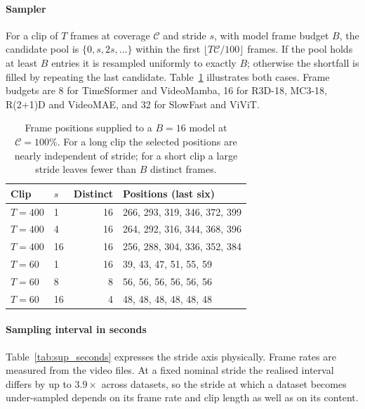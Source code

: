 \documentclass[a4paper, 10pt, conference, onecolumn]{ieeeconf}
\newcommand{\tabtight}{\setlength{\tabcolsep}{3.5pt}\renewcommand{\arraystretch}{1.12}}
\begin{document}
\paragraph{Sampler} For a clip of $T$ frames at coverage $\mathcal{C}$ and
stride $s$, with model frame budget $B$, the candidate pool is
$\{0,s,2s,\dots\}$ within the first $\lfloor T\mathcal{C}/100\rfloor$ frames.
If the pool holds at least $B$ entries it is resampled uniformly to exactly $B$;
otherwise the shortfall is filled by repeating the last candidate.
Table~\ref{tab:sup_indices} illustrates both cases. Frame budgets are 8 for
TimeSformer and VideoMamba, 16 for R3D-18, MC3-18, R(2+1)D and VideoMAE, and 32
for SlowFast and ViViT.

\begin{table}[!htbp]
\centering
\caption{Frame positions supplied to a $B{=}16$ model at $\mathcal{C}{=}100\%$.
For a long clip the selected positions are nearly independent of stride; for a
short clip a large stride leaves fewer than $B$ distinct frames.}
\label{tab:sup_indices}
\scriptsize\tabtight
\begin{tabular}{l l r l}
\toprule
Clip & $s$ & Distinct & Positions (last six) \\
\midrule
$T{=}400$ & 1  & 16 & 266, 293, 319, 346, 372, 399 \\
$T{=}400$ & 4  & 16 & 264, 292, 316, 344, 368, 396 \\
$T{=}400$ & 16 & 16 & 256, 288, 304, 336, 352, 384 \\
\midrule
$T{=}60$  & 1  & 16 & 39, 43, 47, 51, 55, 59 \\
$T{=}60$  & 8  &  8 & 56, 56, 56, 56, 56, 56 \\
$T{=}60$  & 16 &  4 & 48, 48, 48, 48, 48, 48 \\
\bottomrule
\end{tabular}
\end{table}

\paragraph{Sampling interval in seconds} Table~\ref{tab:sup_seconds} expresses
the stride axis physically. Frame rates are measured from the video files. At a
fixed nominal stride the realised interval differs by up to $3.9\times$ across
datasets, so the stride at which a dataset becomes under-sampled depends on its
frame rate and clip length as well as on its content.
\end{document}
